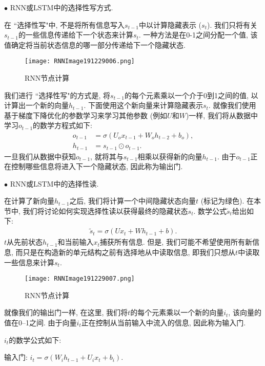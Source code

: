 \begin{example}
$\bullet$ RNN或LSTM中的选择性写方式.

\indent 在 ``选择性写"中, 不是将所有信息写入$s_{t-1}$中以计算隐藏表示 ($s_t$).
我们只将有关$s_{t-1}$的一些信息传递给下一个状态来计算$s_t$.
一种方法是在0-1之间分配一个值, 该值确定将当前状态信息的哪一部分传递给下一个隐藏状态.
\begin{figure}[H]
    \centering
    \texttt{[image: RNNImage191229006.png]}
    \caption{RNN节点计算}
    \label{RNNImage191229006}
    \vspace{-0.4cm}
\end{figure}
我们进行 ``选择性写"的方式是, 将$s_{t-1}$的每个元素乘以一个介于0到1之间的值, 以计算出一个新的向量$h_{t-1}$.
下面使用这个新向量来计算隐藏表示$s_t$.
就像我们使用基于梯度下降优化的参数学习来学习其他参数 (例如$U$和$W$)一样, 我们将从数据中学习$o_{t-1}$的数学方程式如下:
\begin{align}
    o_{t-1}&=\sigma\left (U_{o} x_{t-1}+W_{o} h_{t-2}+b_{o}\right),\\
    h_{t-1}&=s_{t-1} \odot o_{t-1}.
\end{align}
一旦我们从数据中获知$o_{t-1}$, 就将其与$s_{t-1}$相乘以获得新的向量$h_{t-1}$.
由于$o_{t-1}$正在控制哪些信息将进入下一个隐藏状态, 因此称为输出门.

$\bullet$ RNN或LSTM中的选择性读.

在计算了新向量$h_{t-1}$之后, 我们将计算一个中间隐藏状态向量$t$ (标记为绿色).
在本节中, 我们将讨论如何实现选择性读以获得最终的隐藏状态$s_t$.
数学公式$\tilde{s}_{t}$给出如下:
\begin{align}
    \tilde{s}_{t}=\sigma\left (U x_{t}+W h_{t-1}+b\right).
\end{align}
$t$从先前状态$h_{t-1}$和当前输入$x_t$捕获所有信息.
但是, 我们可能不希望使用所有新信息, 而只是在构造新的单元结构之前有选择地从中读取信息,
即我们只想从$t$中读取一些信息来计算$s_t$.
\begin{figure}[H]
    \centering
    \texttt{[image: RNNImage191229007.png]}
    \caption{RNN节点计算}
    \label{RNNImage191229007}
    \vspace{-0.4cm}
\end{figure}
就像我们的输出门一样, 在这里, 我们将$t$的每个元素乘以一个新的向量$i_t$, 该向量的值在0–1之间.
由于向量$i_t$正在控制从当前输入中流入的信息, 因此称为输入门.

$i_t$的数学公式如下:

\quad\quad 输入门: $i_{t}=\sigma\left (W_{i} h_{t-1}+U_{i} x_{t}+b_{i}\right)$.


\end{example}
